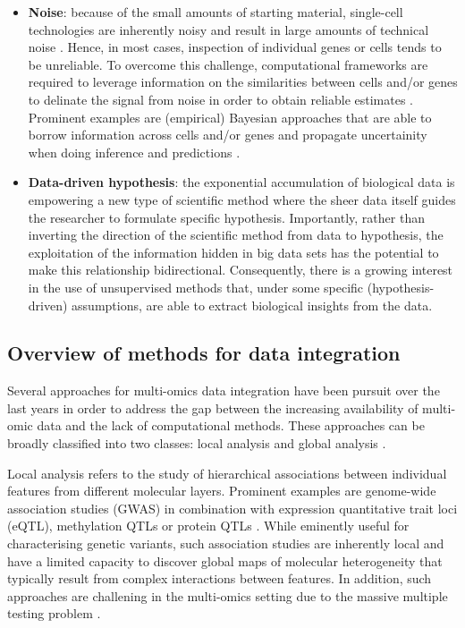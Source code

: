 \begin{itemize}
	\item \textbf{Noise}: because of the small amounts of starting material, single-cell technologies are inherently noisy and result in large amounts of technical noise \cite{Stegle2015}. Hence, in most cases, inspection of individual genes or cells tends to be unreliable. To overcome this challenge, computational frameworks are required to leverage information on the similarities between cells and/or genes to delinate the signal from noise in order to obtain reliable estimates \cite{Vallejos2015}. Prominent examples are (empirical) Bayesian approaches that are able to borrow information across cells and/or genes and propagate uncertainity when doing inference and predictions \cite{Kharchenko2014}.

	\item \textbf{Data-driven hypothesis}: the exponential accumulation of biological data is empowering a new type of scientific method where the sheer data itself guides the researcher to formulate specific hypothesis. Importantly, rather than inverting the direction of the scientific method from data to hypothesis, the exploitation of the information hidden in big data sets has the potential to make this relationship bidirectional. Consequently, there is a growing interest in the use of unsupervised methods that, under some specific (hypothesis-driven) assumptions, are able to extract biological insights from the data.


\end{itemize}

\subsection{Overview of methods for data integration}
Several approaches for multi-omics data integration have been pursuit over the last years in order to address the gap between the increasing availability of multi-omic data and the lack of computational methods. These approaches can be broadly classified into two classes: local analysis and global analysis \cite{Ritchie2015}.

Local analysis refers to the study of hierarchical associations between individual features from different molecular layers. Prominent examples are genome-wide association studies (GWAS) in combination with expression quantitative trait loci (eQTL), methylation QTLs or protein QTLs \cite{VanDerWijst2018,Chen2016,Pierce2018,Bonder2016}. While eminently useful for characterising genetic variants, such association studies are inherently local and have a limited capacity to discover global maps of molecular heterogeneity that typically result from complex interactions between features. In addition, such approaches are challening in the multi-omics setting due to the massive multiple testing problem \cite{Sul2015}.

